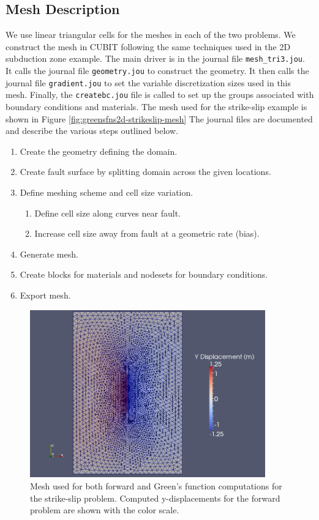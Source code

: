 \subsection{Mesh Description}

We use linear triangular cells for the meshes in each of the two problems.
We construct the mesh in CUBIT following the same techniques used
in the 2D subduction zone example. The main driver is in the journal
file \texttt{mesh\_tri3.jou}. It calls the journal file \texttt{geometry.jou}
to construct the geometry. It then calls the journal file \texttt{gradient.jou}
to set the variable discretization sizes used in this mesh. Finally,
the \texttt{createbc.jou} file is called to set up the groups associated
with boundary conditions and materials. The mesh used for the strike-slip
example is shown in Figure \vref{fig:greensfns2d-strikeslip-mesh}
The journal files are documented and describe the various steps outlined
below.
\begin{enumerate}
\item Create the geometry defining the domain.
\item Create fault surface by splitting domain across the given locations.
\item Define meshing scheme and cell size variation.

\begin{enumerate}
\item Define cell size along curves near fault.
\item Increase cell size away from fault at a geometric rate (bias).
\end{enumerate}
\item Generate mesh.
\item Create blocks for materials and nodesets for boundary conditions.
\item Export mesh.
\end{enumerate}
\begin{figure}
\begin{centering}
\includegraphics[width=4in]{tutorials/greensfns2d/figs/strikeslip_ydispl2}
\par\end{centering}

\caption{Mesh used for both forward and Green's function computations for the
strike-slip problem. Computed y-displacements for the forward problem
are shown with the color scale.\label{fig:greensfns2d-strikeslip-mesh}}
\end{figure}



